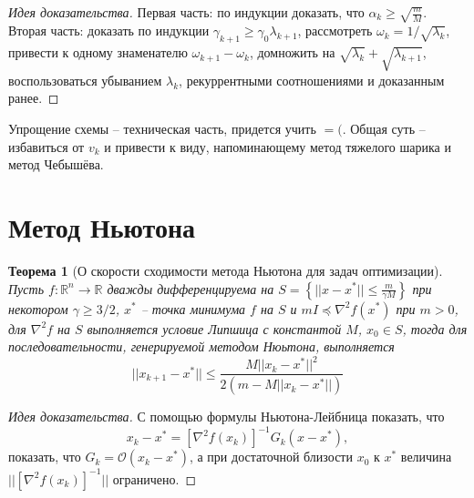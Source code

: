 \documentclass[10pt,a4paper]{article}
\newtheorem{theorem_ru}{Теорема}[section]
\newenvironment{sketch}
    {\begin{proof}[Идея доказательства]
    }
    { 
    \end{proof}
    }
\begin{document}
\begin{sketch}
Первая часть: по индукции доказать, что $\alpha_k\geq \sqrt{\frac{m}{M}}$. \\
Вторая часть: доказать по индукции $\gamma_{k+1}\geq \gamma_0\lambda_{k+1}$, рассмотреть $\omega_k=1/\sqrt{\lambda_k}$, привести к одному знаменателю $\omega_{k+1}-\omega_k$, домножить на $\sqrt{\lambda_k}+\sqrt{\lambda_{k+1}}$, воспользоваться убыванием $\lambda_k$, рекуррентными соотношениями и доказанным ранее.
\end{sketch}

Упрощение схемы -- техническая часть, придется учить $=($. Общая суть -- избавиться от $v_k$ и привести к виду, напоминающему метод тяжелого шарика и метод Чебышёва.

\section{Метод Ньютона}

\begin{theorem_ru}[О скорости сходимости метода Ньютона для задач оптимизации]
Пусть $f:\mathbb{R}^n\rightarrow \mathbb{R}$ дважды дифференцируема на $S=\left\{||x-x^*||\leq\frac{m}{\gamma M}\right\}$ 
при некотором $\gamma\geq 3/2$, $x^*$ -- точка минимума $f$ на $S$ и $mI\preceq\nabla^2 f(x^*)$ при $m>0$, для $\nabla^2 f$ на $S$ выполняется условие Липшица с константой $M$, $x_0\in S$, 
тогда для последовательности, генерируемой методом Нюьтона, выполняется
$$
||x_{k+1}-x^*||\leq \frac{M||x_k-x^*||^2}{2(m-M||x_k-x^*||)}
$$
\end{theorem_ru}

\begin{sketch}
С помощью формулы Ньютона-Лейбница показать, что
$$
x_k-x^*=[\nabla^2 f(x_k)]^{-1}G_k(x-x^*),
$$
показать, что $G_k=\mathcal{O}(x_k-x^*)$, а при достаточной близости $x_0$ к $x^*$ 
величина $||[\nabla^2 f(x_k)]^{-1}||$ ограничено.
\end{sketch}
\end{document}
